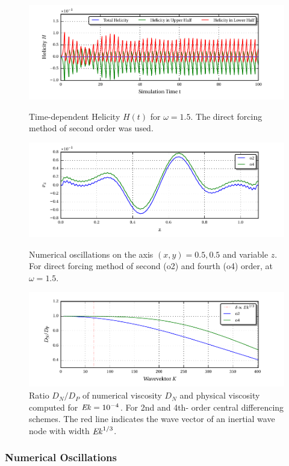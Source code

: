 \begin{figure}[!p]
  \centering
  \includegraphics{gfx/cone/cylinder/helicity.pdf}  \caption{
      Time-dependent Helicity $H(t)$ for $\omega=1.5$. The direct forcing method of second order was used.
      \label{cone:cyl_helicity}
      }
  \centering
  \includegraphics{gfx/cone/cylinder/oscillations.pdf}  \caption{
      Numerical oscillations on the axis $(x,y) = 0.5, 0.5$ and variable $z$.
      For direct forcing method of second (o2) and fourth (o4) order, at $\omega=1.5$.
      \label{cone:cyl_oscillations}
      }
  \centering
  \includegraphics{gfx/cone/cylinder/numvis.pdf}  \caption{
      Ratio $D_N/D_P$ of  numerical viscosity  $D_N$ and physical viscosity computed for $\mbox{\textit{Ek}}=10^{-4}$. For 2nd and 4th- order central differencing schemes.
      The red line indicates the wave vector of an inertial wave node with width $\mbox{\textit{Ek}}^{1/3}$.
      \label{cone:cyl_numvis}
      }
\end{figure}

\subsubsection{Numerical Oscillations}

